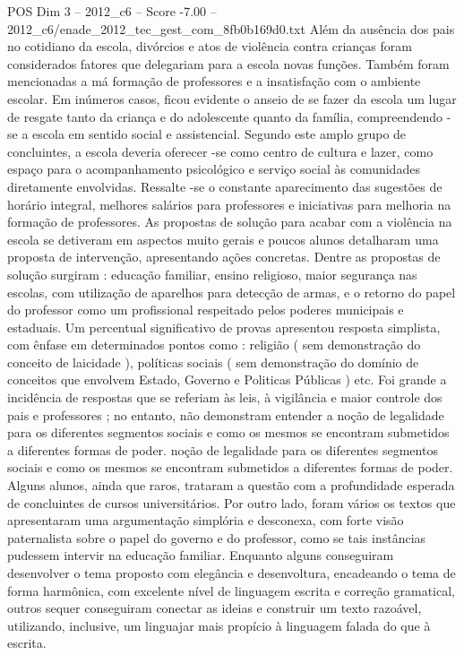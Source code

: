 \begin{textsample}{POS Dim 3 – 2012\_c6 – Score -7.00 – 2012\_c6/enade\_2012\_tec\_gest\_com\_8fb0b169d0.txt}
Além da ausência dos pais no cotidiano da escola, divórcios e atos de violência contra crianças foram considerados fatores que delegariam para a escola novas funções.
Também foram mencionadas a má formação de professores e a insatisfação com o ambiente escolar.
Em inúmeros casos, ficou evidente o anseio de se fazer da escola um lugar de resgate tanto da criança e do adolescente quanto da família, compreendendo -se a escola em sentido social e assistencial.
Segundo este amplo grupo de concluintes, a escola deveria oferecer -se como centro de cultura e lazer, como espaço para o acompanhamento psicológico e serviço social às comunidades diretamente envolvidas.
Ressalte -se o constante aparecimento das sugestões de horário integral, melhores salários para professores e iniciativas para melhoria na formação de professores.
As propostas de solução para acabar com a violência na escola se detiveram em aspectos muito gerais e poucos alunos detalharam uma proposta de intervenção, apresentando ações concretas.
Dentre as propostas de solução surgiram : educação familiar, ensino religioso, maior segurança nas escolas, com utilização de aparelhos para detecção de armas, e o retorno do papel do professor como um profissional respeitado pelos poderes municipais e estaduais.
Um percentual significativo de provas apresentou resposta simplista, com ênfase em determinados pontos como : religião ( sem demonstração do conceito de laicidade ), políticas sociais ( sem demonstração do domínio de conceitos que envolvem Estado, Governo e Politicas Públicas ) etc.
Foi grande a incidência de respostas que se referiam às leis, à vigilância e maior controle dos pais e professores ; no entanto, não demonstram entender a noção de legalidade para os diferentes segmentos sociais e como os mesmos se encontram submetidos a diferentes formas de poder. noção de legalidade para os diferentes segmentos sociais e como os mesmos se encontram submetidos a diferentes formas de poder.
Alguns alunos, ainda que raros, trataram a questão com a profundidade esperada de concluintes de cursos universitários.
Por outro lado, foram vários os textos que apresentaram uma argumentação simplória e desconexa, com forte visão paternalista sobre o papel do governo e do professor, como se tais instâncias pudessem intervir na educação familiar.
Enquanto alguns conseguiram desenvolver o tema proposto com elegância e desenvoltura, encadeando o tema de forma harmônica, com excelente nível de linguagem escrita e correção gramatical, outros sequer conseguiram conectar as ideias e construir um texto razoável, utilizando, inclusive, um linguajar mais propício à linguagem falada do que à escrita.

\end{textsample}

